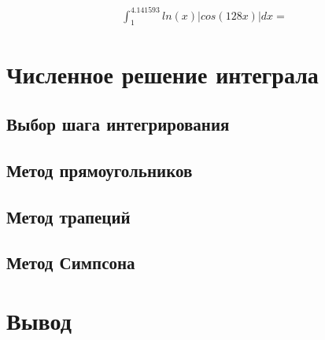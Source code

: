 \documentclass[a4paper,11pt]{article}
\begin{document}
\begin{equation}
    \begin{split}
        \int_1^{4.141593} ln(x) |cos(128x)|dx =
    \end{split}
\end{equation}

\section{Численное решение интеграла}

\subsection{Выбор шага интегрирования}

\subsection{Метод прямоугольников}

\subsection{Метод трапеций}

\subsection{Метод Симпсона}

\section{Вывод}







\end{document}
